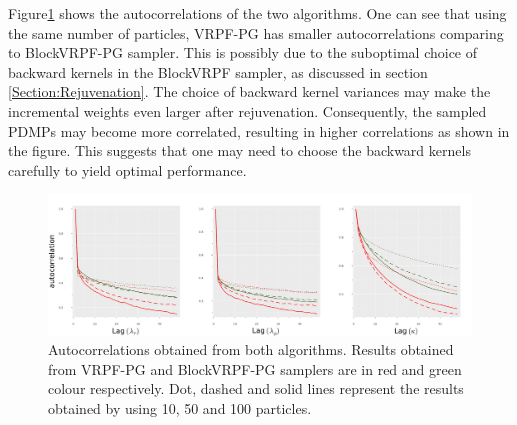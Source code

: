 \documentclass[12pt,a4paper]{article}
\begin{document}
Figure\ref{Figure: SNC-ACF} shows the autocorrelations of the two algorithms. One can see that using the same number of particles, VRPF-PG has smaller autocorrelations comparing to BlockVRPF-PG sampler. This is possibly due to the suboptimal choice of backward kernels in the BlockVRPF sampler, as discussed in section \ref{Section:Rejuvenation}. The choice of backward kernel variances may make the incremental weights even larger after rejuvenation. Consequently, the sampled PDMPs may become more correlated, resulting in higher correlations as shown in the figure. This suggests that one may need to choose the backward kernels carefully to yield optimal performance. 
\begin{figure}[htb!]
    \centering
    \includegraphics[width=\textwidth]{SNC_ACF.pdf}
    \caption{Autocorrelations obtained from both algorithms. Results obtained from VRPF-PG and BlockVRPF-PG samplers are in red and green colour respectively. Dot, dashed and solid lines represent the results obtained by using 10, 50 and 100 particles.}
    \label{Figure: SNC-ACF}
\end{figure}

\newpage


\end{document}
